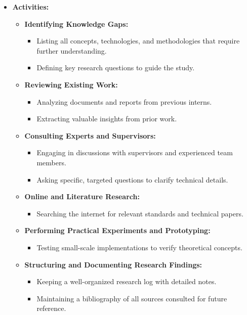\documentclass{article}
\begin{document}
\begin{itemize}[leftmargin=*, label={}]
    \item \textbf{Activities:}
        \begin{itemize}
            \item \textbf{Identifying Knowledge Gaps:}
                \begin{itemize}
                    \item Listing all concepts, technologies, and methodologies that require further understanding.
                    \item Defining key research questions to guide the study.
                \end{itemize}
            \item \textbf{Reviewing Existing Work:}
                \begin{itemize}
                    \item Analyzing documents and reports from previous interns.
                    \item Extracting valuable insights from prior work.
                \end{itemize}
            \item \textbf{Consulting Experts and Supervisors:}
                \begin{itemize}
                    \item Engaging in discussions with supervisors and experienced team members.
                    \item Asking specific, targeted questions to clarify technical details.
                \end{itemize}
            \item \textbf{Online and Literature Research:}
                \begin{itemize}
                    \item Searching the internet for relevant standards and technical papers. 
                \end{itemize}
            \item \textbf{Performing Practical Experiments and Prototyping:}
                \begin{itemize}
                    \item Testing small-scale implementations to verify theoretical concepts.
                \end{itemize}
            \item \textbf{Structuring and Documenting Research Findings:}
                \begin{itemize}
                    \item Keeping a well-organized research log with detailed notes.
                    \item Maintaining a bibliography of all sources consulted for future reference.
                \end{itemize}
        \end{itemize}


\end{itemize}
\end{document}
